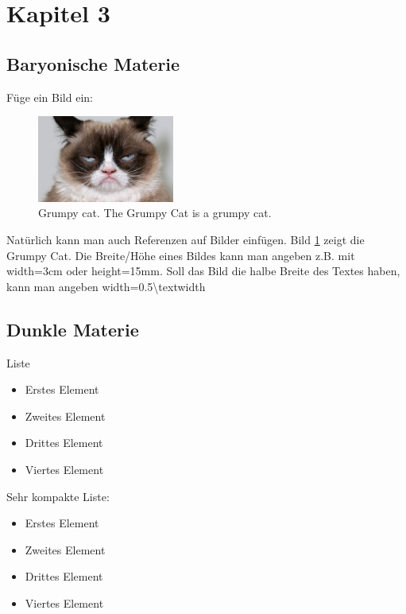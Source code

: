 
\section{Kapitel 3}

\lipsum[4]

\subsection{Baryonische Materie}

Füge ein Bild ein:
\begin{figure}[H]
	\centering
	\includegraphics[width=0.4\textwidth]{figures/grumpy_cat}
	\caption[Eintrag in Abbildungsverzeichnis von Grumpy Cat]{Grumpy cat. The Grumpy Cat is a grumpy cat.}
	\label{fig grumpy cat.}
\end{figure}
Natürlich kann man auch Referenzen auf Bilder einfügen.
Bild \ref{fig grumpy cat.} zeigt die Grumpy Cat.
Die Breite/Höhe eines Bildes kann man angeben z.B. mit width=3cm oder height=15mm.
Soll das Bild die halbe Breite des Textes haben, kann man angeben
width=0.5\textbackslash textwidth

\newpage

\subsection{Dunkle Materie}

Liste
\begin{itemize}
	\item Erstes Element
	\item Zweites Element
	\item Drittes Element
	\item Viertes Element
\end{itemize}

Sehr kompakte Liste:
\begin{itemize}
	\vspace{-\topsep}
	\setlength{\itemsep}{0pt}\setlength{\parskip}{0pt}
	\item Erstes Element
	\item Zweites Element
	\item Drittes Element
	\item Viertes Element
\end{itemize}

